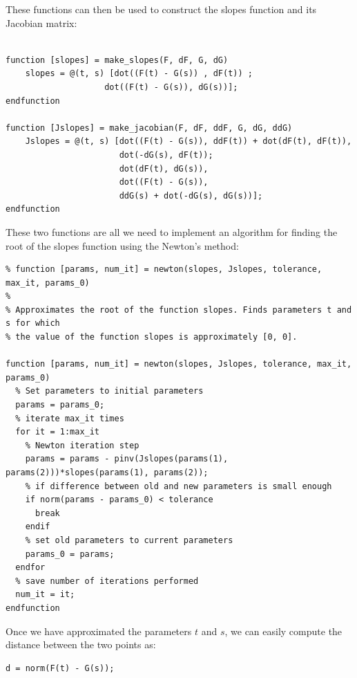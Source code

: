 \documentclass[A4]{article}
\begin{document}
\pagebreak
These functions can then be used to construct the slopes function and its Jacobian matrix:
\vspace{0.2cm}
\begin{tcolorbox}
	\begin{small}
	\begin{verbatim}

function [slopes] = make_slopes(F, dF, G, dG)
	slopes = @(t, s) [dot((F(t) - G(s)) , dF(t)) ; 
					dot((F(t) - G(s)), dG(s))];
endfunction

function [Jslopes] = make_jacobian(F, dF, ddF, G, dG, ddG)
	Jslopes = @(t, s) [dot((F(t) - G(s)), ddF(t)) + dot(dF(t), dF(t)),
	 				   dot(-dG(s), dF(t)); 
                       dot(dF(t), dG(s)), 
                       dot((F(t) - G(s)), 
                       ddG(s) + dot(-dG(s), dG(s))];
endfunction
	\end{verbatim}
	\end{small}
\end{tcolorbox}

These two functions are all we need to implement an algorithm for finding the root of the slopes function using the Newton's method:
\vspace{0.2cm}
\begin{tcolorbox}
	 \begin{scriptsize}
	\begin{verbatim}
% function [params, num_it] = newton(slopes, Jslopes, tolerance, max_it, params_0)
%
% Approximates the root of the function slopes. Finds parameters t and s for which
% the value of the function slopes is approximately [0, 0].

function [params, num_it] = newton(slopes, Jslopes, tolerance, max_it, params_0)
  % Set parameters to initial parameters
  params = params_0;
  % iterate max_it times
  for it = 1:max_it
    % Newton iteration step
    params = params - pinv(Jslopes(params(1), params(2)))*slopes(params(1), params(2));
    % if difference between old and new parameters is small enough
    if norm(params - params_0) < tolerance
      break
    endif
    % set old parameters to current parameters
    params_0 = params;
  endfor
  % save number of iterations performed
  num_it = it;
endfunction
	\end{verbatim}
		 \end{scriptsize}
\end{tcolorbox}

Once we have approximated the parameters $t$ and $s$, we can easily compute the distance between the two points as:
\vspace{0.2cm}
\begin{tcolorbox}
	\begin{verbatim}
d = norm(F(t) - G(s));
	\end{verbatim}
\end{tcolorbox}
\end{document}
